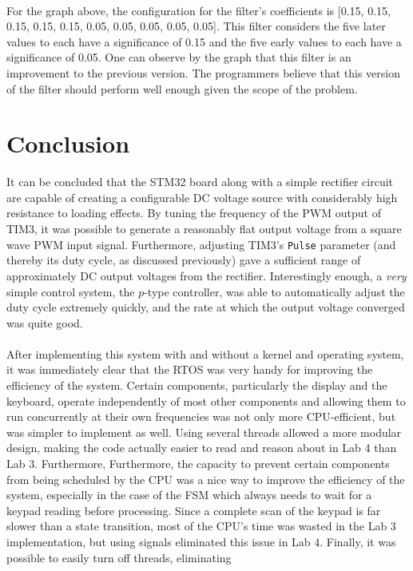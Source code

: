 \documentclass[12pt]{report}
\begin{document}
\\For the graph above, the configuration for the filter's coefficients is [0.15, 0.15, 0.15, 0.15, 0.15, 0.05, 0.05, 0.05, 0.05, 0.05]. This filter considers the five later values to each have a significance of 0.15 and the five early values to each have a significance of 0.05. One can observe by the graph that this filter is an improvement to the previous version. The programmers believe that this version of the filter should perform well enough given the scope of the problem.

\section{Conclusion}
It can be concluded that the STM32 board along with a simple rectifier circuit are capable of
creating a configurable DC voltage source with considerably high resistance to loading effects. By
tuning the frequency of the PWM output of TIM3, it was possible to generate a reasonably flat output
voltage from a square wave PWM input signal. Furthermore, adjusting TIM3's \texttt{Pulse} parameter
(and thereby its duty cycle, as discussed previously) gave a sufficient range of approximately DC
output voltages from the rectifier. Interestingly enough, a \textit{very} simple control system, the
$p$-type controller, was able to automatically adjust the duty cycle extremely quickly, and the
rate at which the output voltage converged was quite good.\\\\
After implementing this system with and without a kernel and operating system, it was immediately
clear that the RTOS was very handy for improving the efficiency of the system. Certain components,
particularly the display and the keyboard, operate independently of most other components and
allowing them to run concurrently at their own frequencies was not only more CPU-efficient, but was
simpler to implement as well. Using several threads allowed a more modular design, making the code
actually easier to read and reason about in Lab 4 than Lab 3. Furthermore, Furthermore, the capacity
to prevent certain components from being scheduled by the CPU was a nice way to improve the
efficiency of the system, especially in the case of the FSM which always needs to wait for a keypad
reading before processing. Since a complete scan of the keypad is far slower than a state
transition, most of the CPU's time was wasted in the Lab 3 implementation, but using signals
eliminated this issue in Lab 4. Finally, it was possible to easily turn off threads, eliminating
\end{document}
